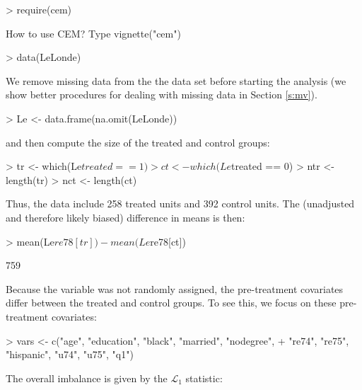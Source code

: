 \documentclass[article]{jss}
\begin{document}
\begin{Schunk}
\begin{Sinput}
> require(cem)
\end{Sinput}
\begin{Soutput}
How to use CEM? Type vignette("cem")
\end{Soutput}
\begin{Sinput}
> data(LeLonde)
\end{Sinput}
\end{Schunk}
We remove missing data from the the data set before starting the
analysis (we show better procedures for dealing with missing data in
Section \ref{s:mv}).
\begin{Schunk}
\begin{Sinput}
> Le <- data.frame(na.omit(LeLonde))
\end{Sinput}
\end{Schunk}
and then compute the size of the treated and control groups:
\begin{Schunk}
\begin{Sinput}
> tr <- which(Le$treated == 1)
> ct <- which(Le$treated == 0)
> ntr <- length(tr)
> nct <- length(ct)
\end{Sinput}
\end{Schunk}
Thus, the data include 258 treated units and 392 control
units.  The (unadjusted and therefore likely biased) difference in 
means is then:

\begin{Schunk}
\begin{Sinput}
> mean(Le$re78[tr]) - mean(Le$re78[ct])
\end{Sinput}
\begin{Soutput}
[1] 759
\end{Soutput}
\end{Schunk}

Because the variable  was not randomly assigned, the
pre-treatment covariates differ between the treated and control
groups.  To see this, we focus on these pre-treatment covariates:

\begin{Schunk}
\begin{Sinput}
> vars <- c("age", "education", "black", "married", "nodegree", 
+     "re74", "re75", "hispanic", "u74", "u75", "q1")
\end{Sinput}
\end{Schunk}

The overall imbalance is given by the $\mathcal L_1$ statistic:
\end{document}
